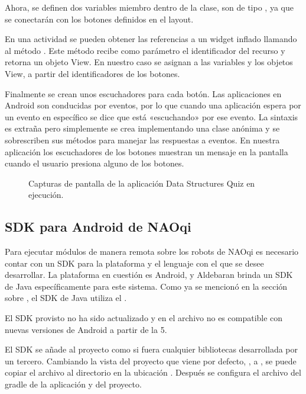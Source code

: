 Ahora, se definen dos variables miembro dentro de la clase, son de tipo
, ya que se conectarán con los botones definidos en el layout.

En una actividad se pueden obtener las referencias a un widget inflado llamando
al método . Este método recibe como parámetro el identificador del recurso
y retorna un objeto View. En nuestro caso se asignan a las variables
 y  los objetos View, a partir del identificadores de los botones.

Finalmente se crean unos escuchadores para cada botón. Las aplicaciones en
Android son conducidas por eventos, por lo que cuando una aplicación espera
por un evento en específico se dice que está «escuchando» por ese evento. La
sintaxis es extraña pero simplemente se crea implementando una clase anónima
y se sobrescriben sus métodos para manejar las respuestas a eventos. En nuestra
aplicación los escuchadores de los botones muestran un mensaje en la pantalla
cuando el usuario presiona alguno de los botones.


\begin{figure}%
    \centering
    \qquad
    \caption{Capturas de pantalla de la aplicación  Data Structures Quiz en ejecución.}
    \label{fig:quiz_app}%
\end{figure}

\subsection*{SDK para Android de NAOqi}
\label{\detokenize{dev_docs:sdk-para-android-de-naoqi}}
Para ejecutar módulos de manera remota sobre los robots de NAOqi es necesario
contar con un SDK para la plataforma y el lenguaje con el que se desee
desarrollar. La plataforma en cuestión es Android, y Aldebaran brinda un SDK
de Java específicamente para este sistema. Como ya se mencionó en la sección
sobre , el SDK de Java utiliza el .

El SDK provisto  no ha sido actualizado y en el archivo  no es compatible
con nuevas versiones de Android a partir de la 5.

El SDK se añade al proyecto como si fuera cualquier bibliotecas desarrollada
por un tercero. Cambiando la vista del proyecto que viene por defecto, ,
a , se puede copiar el archivo 
al directorio en la ubicación . Después se configura el archivo
del gradle de la aplicación y del proyecto.


